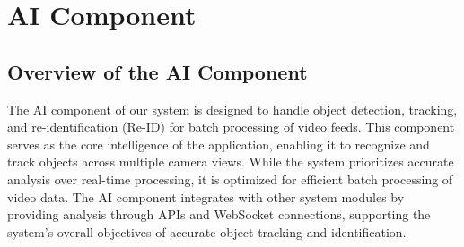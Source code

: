 

    
    




\section{AI Component}
\label{section:ai-component}

\subsection{Overview of the AI Component}
\label{subsection:ai-component-overview}

The AI component of our system is designed to handle object detection, tracking, and re-identification (Re-ID) for batch processing of video feeds. This component serves as the core intelligence of the application, enabling it to recognize and track objects across multiple camera views. While the system prioritizes accurate analysis over real-time processing, it is optimized for efficient batch processing of video data. The AI component integrates with other system modules by providing analysis through APIs and WebSocket connections, supporting the system's overall objectives of accurate object tracking and identification.

